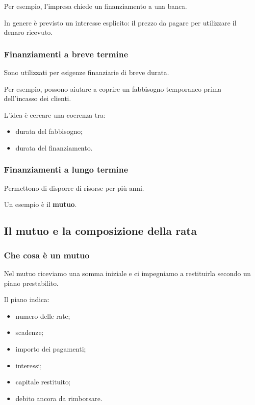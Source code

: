\noindent Per esempio,
l'impresa chiede un finanziamento
a una banca.

\noindent In genere è previsto
un interesse esplicito:
il prezzo da pagare
per utilizzare il denaro ricevuto.


\subsubsection*{Finanziamenti a breve termine}

\noindent Sono utilizzati
per esigenze finanziarie di breve durata.

\noindent Per esempio,
possono aiutare a coprire
un fabbisogno temporaneo
prima dell'incasso dei clienti.

\noindent L'idea è cercare
una coerenza tra:

\begin{itemize}
    \item durata del fabbisogno;
    \item durata del finanziamento.
\end{itemize}


\subsubsection*{Finanziamenti a lungo termine}

\noindent Permettono di disporre
di risorse per più anni.

\noindent Un esempio è il \textbf{mutuo}.


\subsection{Il mutuo e la composizione della rata}

\subsubsection*{Che cosa è un mutuo}

\noindent Nel mutuo riceviamo
una somma iniziale
e ci impegniamo a restituirla
secondo un piano prestabilito.

\noindent Il piano indica:

\begin{itemize}
    \item numero delle rate;
    \item scadenze;
    \item importo dei pagamenti;
    \item interessi;
    \item capitale restituito;
    \item debito ancora da rimborsare.
\end{itemize}

